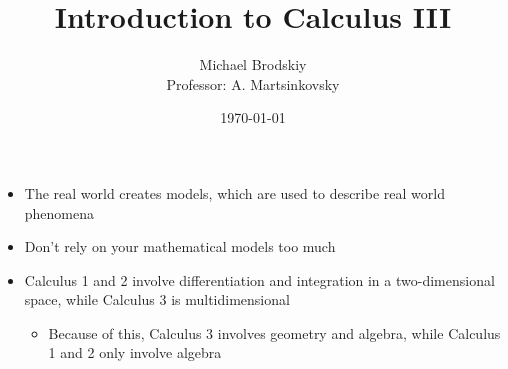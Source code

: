 

\title{Introduction to Calculus III}
\date{\today}
\author{Michael Brodskiy\\ \small Professor: A. Martsinkovsky}



\maketitle

\begin{itemize}

  \item The real world creates models, which are used to describe real world phenomena

  \item Don't rely on your mathematical models too much

  \item Calculus 1 and 2 involve differentiation and integration in a two-dimensional space, while Calculus 3 is multidimensional

    \begin{itemize}

      \item Because of this, Calculus 3 involves geometry and algebra, while Calculus 1 and 2 only involve algebra

    \end{itemize}

\end{itemize}



